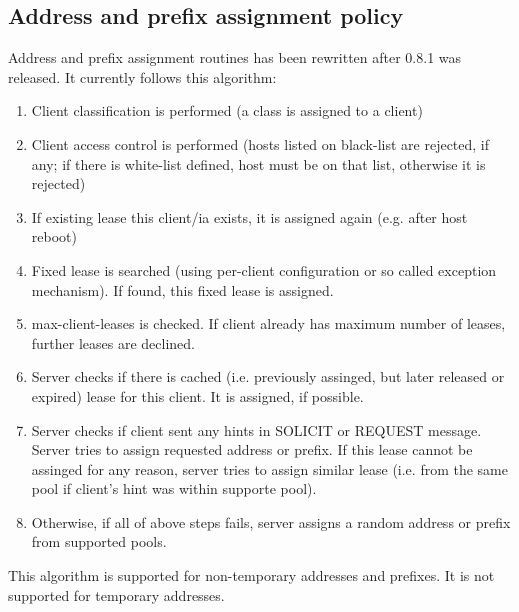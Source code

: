 \subsection{Address and prefix assignment policy}

Address and prefix assignment routines has been rewritten after 0.8.1
was released. It currently follows this algorithm:

\begin{enumerate}
\item Client classification is performed (a class is assigned to a client)
\item Client access control is performed (hosts listed on black-list are rejected,
  if any; if there is white-list defined, host must be on that list,
  otherwise it is rejected)
\item If existing lease this client/ia exists, it is assigned again
  (e.g. after host reboot)
\item Fixed lease is searched (using per-client configuration or so
  called exception mechanism). If found, this fixed lease is assigned.
\item max-client-leases is checked. If client already has maximum
  number of leases, further leases are declined.
\item Server checks if there is cached (i.e. previously assinged, but
  later released or expired) lease for this client. It is assigned, if
  possible.
\item Server checks if client sent any hints in SOLICIT or REQUEST
  message. Server tries to assign requested address or prefix. If this lease cannot be
  assinged for any reason, server tries to assign similar lease
  (i.e. from the same pool if client's hint was within supporte
  pool).
\item Otherwise, if all of above steps fails, server assigns a random
  address or prefix from supported pools.
\end{enumerate}

This algorithm is supported for non-temporary addresses and
prefixes. It is not supported for temporary addresses.

